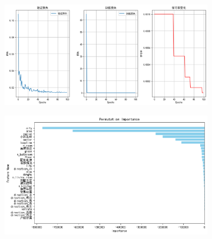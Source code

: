 \documentclass{beamer}
\begin{document}
\begin{frame}
\begin{figure}
\begin{minipage}[b]{0.28\textwidth}
        \end{minipage}
        \begin{minipage}[b]{0.68\textwidth}
            \begin{figure}
                \center
                \includegraphics[width=\linewidth]{figure/nn_train.png}
            \end{figure}
            \begin{figure}
                \center
                \includegraphics[width=\linewidth]{figure/perin.png}
            \end{figure}
        \end{minipage}
    \end{figure}
\end{frame}
\end{document}
